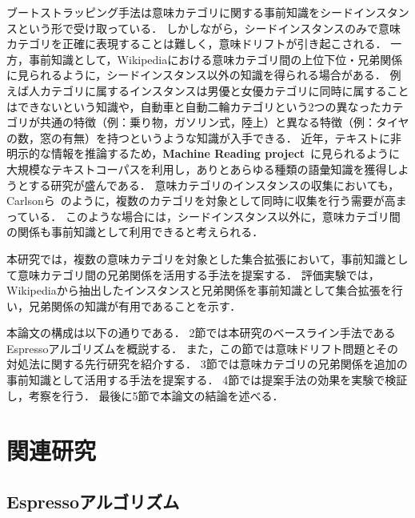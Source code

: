 \documentclass[japanese]{jnlp_1.4}
\begin{document}
ブートストラッピング手法は意味カテゴリに関する事前知識をシードインスタンスという形で受け取っている．
しかしながら，シードインスタンスのみで意味カテゴリを正確に表現することは難しく，意味ドリフトが引き起こされる．
一方，事前知識として，Wikipediaにおける意味カテゴリ間の上位下位・兄弟関係に見られるように，シードインスタンス以外の知識を得られる場合がある．
例えば人カテゴリに属するインスタンスは男優と女優カテゴリに同時に属することはできないという知識や，自動車と自動二輪カテゴリという2つの異なったカテゴリが共通の特徴（例：乗り物，ガソリン式，陸上）と異なる特徴（例：タイヤの数，窓の有無）を持つというような知識が入手できる．
近年，テキストに非明示的な情報を推論するため，\textbf{Machine Reading project}~\cite{Etzioni:06}に見られるように大規模なテキストコーパスを利用し，ありとあらゆる種類の語彙知識を獲得しようとする研究が盛んである．
意味カテゴリのインスタンスの収集においても，Carlsonら~\cite{Carlson10towardan}のように，複数のカテゴリを対象として同時に収集を行う需要が高まっている．
このような場合には，シードインスタンス以外に，意味カテゴリ間の関係も事前知識として利用できると考えられる．

本研究では，複数の意味カテゴリを対象とした集合拡張において，事前知識として意味カテゴリ間の兄弟関係を活用する手法を提案する．
評価実験では，Wikipediaから抽出したインスタンスと兄弟関係を事前知識として集合拡張を行い，兄弟関係の知識が有用であることを示す．

本論文の構成は以下の通りである．
2節では本研究のベースライン手法であるEspressoアルゴリズムを概説する．
また，この節では意味ドリフト問題とその対処法に関する先行研究を紹介する．
3節では意味カテゴリの兄弟関係を追加の事前知識として活用する手法を提案する．
4節では提案手法の効果を実験で検証し，考察を行う．
最後に5節で本論文の結論を述べる．


\section{関連研究}

\subsection{Espressoアルゴリズム}
\label{Espresso}
\end{document}
